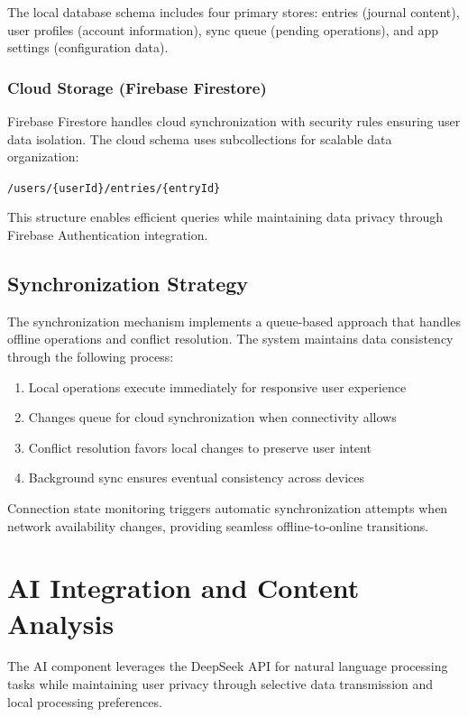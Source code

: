 \documentclass[conference]{IEEEtran}
\begin{document}
{\begin{IEEEkeywords}
The local database schema includes four primary stores: entries (journal content), user profiles (account information), sync queue (pending operations), and app settings (configuration data).

\subsubsection{Cloud Storage (Firebase Firestore)}

Firebase Firestore handles cloud synchronization with security rules ensuring user data isolation. The cloud schema uses subcollections for scalable data organization:

\texttt{/users/\{userId\}/entries/\{entryId\}}

This structure enables efficient queries while maintaining data privacy through Firebase Authentication integration.

\subsection{Synchronization Strategy}

The synchronization mechanism implements a queue-based approach that handles offline operations and conflict resolution. The system maintains data consistency through the following process:

\begin{enumerate}
\item Local operations execute immediately for responsive user experience
\item Changes queue for cloud synchronization when connectivity allows
\item Conflict resolution favors local changes to preserve user intent
\item Background sync ensures eventual consistency across devices
\end{enumerate}

Connection state monitoring triggers automatic synchronization attempts when network availability changes, providing seamless offline-to-online transitions.

\section{AI Integration and Content Analysis}

The AI component leverages the DeepSeek API for natural language processing tasks while maintaining user privacy through selective data transmission and local processing preferences.


\end{IEEEkeywords}}
\end{document}
